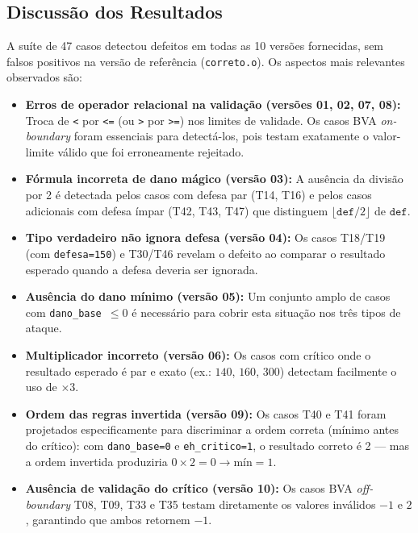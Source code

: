 \documentclass[conference, onecolumn]{IEEEtran}
\begin{document}
\subsection{Discussão dos Resultados}

A suíte de 47 casos detectou defeitos em todas as 10 versões fornecidas, sem falsos positivos
na versão de referência (\texttt{correto.o}). Os aspectos mais relevantes observados são:

\begin{itemize}
    \item \textbf{Erros de operador relacional na validação (versões 01, 02, 07, 08):}
    Troca de \texttt{<} por \texttt{<=} (ou \texttt{>} por \texttt{>=}) nos limites de
    validade. Os casos BVA \textit{on-boundary} foram essenciais para detectá-los, pois
    testam exatamente o valor-limite válido que foi erroneamente rejeitado.

    \item \textbf{Fórmula incorreta de dano mágico (versão 03):}
    A ausência da divisão por 2 é detectada pelos casos com defesa par (T14, T16) e
    pelos casos adicionais com defesa ímpar (T42, T43, T47) que distinguem
    $\lfloor\texttt{def}/2\rfloor$ de $\texttt{def}$.

    \item \textbf{Tipo verdadeiro não ignora defesa (versão 04):}
    Os casos T18/T19 (com \texttt{defesa=150}) e T30/T46 revelam o defeito ao
    comparar o resultado esperado quando a defesa deveria ser ignorada.

    \item \textbf{Ausência do dano mínimo (versão 05):}
    Um conjunto amplo de casos com \texttt{dano\_base $\leq 0$} é necessário para cobrir
    esta situação nos três tipos de ataque.

    \item \textbf{Multiplicador incorreto (versão 06):}
    Os casos com crítico onde o resultado esperado é par e exato (ex.: $140$, $160$,
    $300$) detectam facilmente o uso de $\times 3$.

    \item \textbf{Ordem das regras invertida (versão 09):}
    Os casos T40 e T41 foram projetados especificamente para discriminar a ordem
    correta (mínimo antes do crítico): com \texttt{dano\_base=0} e
    \texttt{eh\_critico=1}, o resultado correto é 2 — mas a ordem invertida produziria
    $0 \times 2 = 0 \to \text{mín} = 1$.

    \item \textbf{Ausência de validação do crítico (versão 10):}
    Os casos BVA \textit{off-boundary} T08, T09, T33 e T35 testam diretamente os
    valores inválidos $-1$ e $2$, garantindo que ambos retornem $-1$.
\end{itemize}
\end{document}

